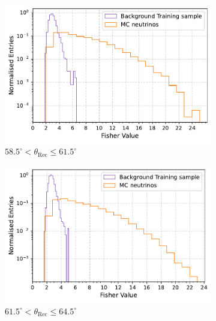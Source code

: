 \begin{figure}[h!]
  \centering
   \begin{subfigure}[l]{.48\textwidth}
     \centering
     \includegraphics[width=\linewidth]{thesis_figures/Nu_analysis/Fisher_plots/Fisher_nu_bkg_region_58.5_61.5.pdf}
     \caption{$ 58.5^{\circ} <\theta_{\text{Rec}} \leq 61.5^{\circ}$ }
     \label{fig:GEM1_after_prev}
   \end{subfigure}
   \begin{subfigure}[r]{.48\textwidth}
     \centering
     \includegraphics[width=\linewidth]{thesis_figures/Nu_analysis/Fisher_plots/Fisher_nu_bkg_region_61.5_64.5.pdf}
     \caption{$61.5^{\circ} <\theta_{\text{Rec}} \leq 64.5^{\circ}$}
    \end{subfigure}
    \hfill
    \begin{subfigure}[l]{.48\textwidth}
      \centering

\end{subfigure}
\end{figure}
